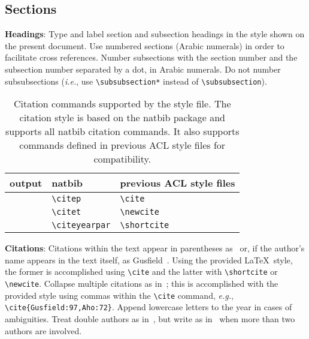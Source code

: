 \documentclass[11pt,a4paper]{article}
\begin{document}
\subsection{Sections}

\textbf{Headings}: Type and label section and subsection headings in the
style shown on the present document.  Use numbered sections (Arabic
numerals) in order to facilitate cross references. Number subsections
with the section number and the subsection number separated by a dot, in Arabic numerals.
Do not number subsubsections ({\em i.e.}, use \verb|\subsubsection*| instead of \verb|\subsubsection|).

\begin{table*}
\centering
\begin{tabular}{lll}
  output & natbib & previous ACL style files\\
  \hline
  \citep{Gusfield:97} & \verb|\citep| & \verb|\cite| \\
  \citet{Gusfield:97} & \verb|\citet| & \verb|\newcite| \\
  \citeyearpar{Gusfield:97} & \verb|\citeyearpar| & \verb|\shortcite| \\
\end{tabular}
\caption{Citation commands supported by the style file.
  The citation style is based on the natbib package and
  supports all natbib citation commands.
  It also supports commands defined in previous ACL style files
  for compatibility.
  }
\end{table*}

\textbf{Citations}: Citations within the text appear in parentheses
as~\cite{Gusfield:97} or, if the author's name appears in the text
itself, as Gusfield~.
Using the provided \LaTeX\ style, the former is accomplished using
{\verb|\cite|} and the latter with {\verb|\shortcite|} or {\verb|\newcite|}.
Collapse multiple citations as in~\cite{Gusfield:97,Aho:72}; this is accomplished with the provided style using commas within the {\verb|\cite|} command, {\em e.g.}, {\verb|\cite{Gusfield:97,Aho:72}|}.
Append lowercase letters to the year in cases of ambiguities.
 Treat double authors as
in~\cite{Aho:72}, but write as in~\cite{Chandra:81} when more than two
authors are involved.
\end{document}
